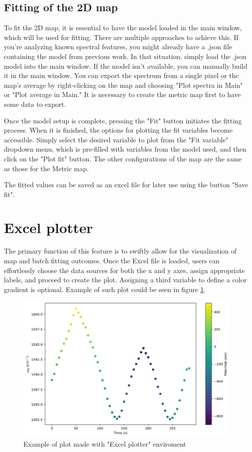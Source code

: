 \subsection{Fitting of the 2D map}
To fit the 2D map, it is essential to have the model loaded in the main window, which will be used for fitting. There are multiple approaches to achieve this. If you're analyzing known spectral features, you might already have a .json file containing the model from previous work. In that situation, simply load the .json model into the main window. If the model isn't available, you can manually build it in the main window. You can export the spectrum from a single pixel or the map's average by right-clicking on the map and choosing "Plot spectra in Main" or "Plot average in Main." It is necessary to create the metric map first to have some data to export.

Once the model setup is complete, pressing the "Fit" button initiates the fitting process. When it is finished, the options for plotting the fit variables become accessible. Simply select the desired variable to plot from the "Fit variable" dropdown menu, which is pre-filled with variables from the model used, and then click on the "Plot fit" button. The other configurations of the map are the same as those for the Metric map.

The fitted values can be saved as an excel file for later use using the button "Save fit".

\section{Excel plotter}
The primary function of this feature is to swiftly allow for the visualization of map and batch fitting outcomes. Once the Excel file is loaded, users can effortlessly choose the data sources for both the x and y axes, assign appropriate labels, and proceed to create the plot. Assigning a third variable to define a color gradient is optional. Example of such plot could be seen in figure \ref{excel_plot}.

\begin{figure}
    \centering
    \includegraphics[width=0.75\linewidth]{Resources/Excel_plot.png}
    \caption{Example of plot made with "Excel plotter" enviroment}
    \label{excel_plot}
\end{figure}

